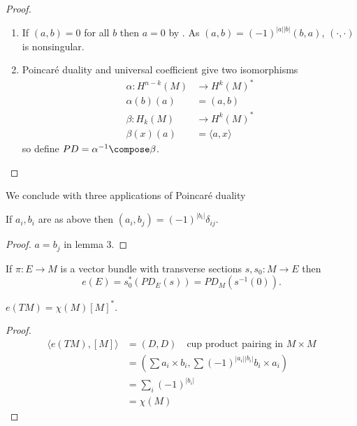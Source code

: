 \documentclass[a4paper]{article}
\begin{document}
\begin{proof}\leavevmode
  \begin{enumerate}
  \item If \((a, b) = 0\) for all \(b\) then \(a = 0\) by . As \((a, b) = (-1)^{|a||b|} (b, a)\), \((\cdot, \cdot)\) is nonsingular.
  \item Poincaré duality and universal coefficient give two isomorphisms
    \begin{align*}
      \alpha: H^{n - k}(M) &\to H^k(M)^* \\
      \alpha(b)(a) &= (a, b) \\
      \beta: H_k(M) &\to H^k(M)^* \\
      \beta(x)(a) &= \langle a, x \rangle
    \end{align*}
    so define \(PD = \alpha^{-1} \compose \beta\).
  \end{enumerate}
\end{proof}

We conclude with three applications of Poincaré duality

\begin{proposition}
  If \(a_i, b_i\) are as above then \((a_i, b_j) = (-1)^{|b_i|} \delta_{ij}\).
\end{proposition}

\begin{proof}
  \(a = b_j\) in lemma 3.
\end{proof}

\begin{proposition}
  If \(\pi: E \to M\) is a vector bundle with transverse sections \(s, s_0: M \to E\) then
  \[
    e(E) = s_0^*(PD_E(s)) = PD_M(s^{-1}(0)).
  \]
\end{proposition}

\begin{proposition}
  \(e(TM) = \chi(M) [M]^*\).
\end{proposition}

\begin{proof}
  \begin{align*}
    \langle e(TM), [M] \rangle
    &= (D, D) \quad \text{cup product pairing in } M \times M \\
    &= (\sum a_i \times b_i, \sum (-1)^{|a_i||b_i|} b_i \times a_i) \\
    &= \sum_i (-1)^{|b_i|} \\
    &= \chi(M)
  \end{align*}
\end{proof}

\printindex
\end{document}
